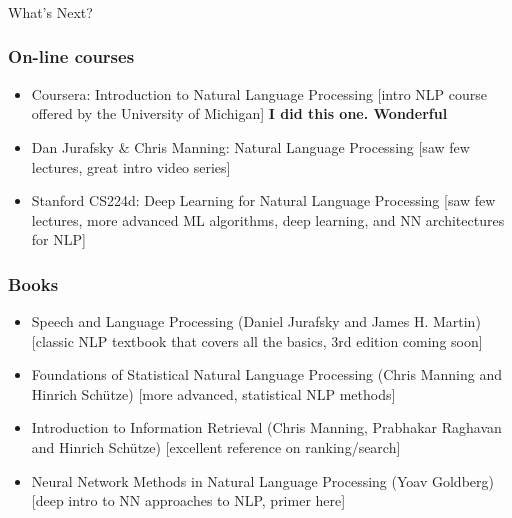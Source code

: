 \begin{frame}[fragile]\frametitle{}

\begin{center}
{\Large What's Next?}
\end{center}
\end{frame}


\begin{frame}[fragile]\frametitle{On-line courses}
\begin{itemize}
\item Coursera: Introduction to Natural Language Processing [intro NLP course offered by the University of Michigan] {\bf I did this one. Wonderful}
\item Dan Jurafsky \& Chris Manning: Natural Language Processing [saw few lectures, great intro video series]
\item Stanford CS224d: Deep Learning for Natural Language Processing [saw few lectures, more advanced ML algorithms, deep learning, and NN architectures for NLP]

\end{itemize}
\end{frame}

\begin{frame}[fragile]\frametitle{Books}
\begin{itemize}
\item     Speech and Language Processing (Daniel Jurafsky and James H. Martin) [classic NLP textbook that covers all the basics, 3rd edition coming soon]
\item         Foundations of Statistical Natural Language Processing (Chris Manning and Hinrich Schütze) [more advanced, statistical NLP methods]
\item         Introduction to Information Retrieval (Chris Manning, Prabhakar Raghavan and Hinrich Schütze) [excellent reference on ranking/search]
\item         Neural Network Methods in Natural Language Processing (Yoav Goldberg) [deep intro to NN approaches to NLP, primer here]
\end{itemize}
\end{frame}

